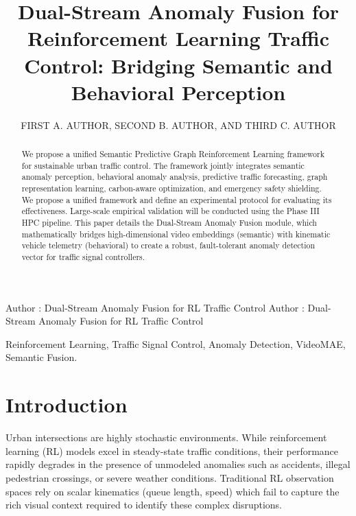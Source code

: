 \documentclass{ieeeaccess}
\begin{document}

\title{Dual-Stream Anomaly Fusion for Reinforcement Learning Traffic Control: Bridging Semantic and Behavioral Perception}
\author{\uppercase{First A. Author},
\uppercase{Second B. Author, and Third C. Author}}
\address[1]{Department of Computer Science, University of Technology, City, Country}

\markboth
{Author \headeretal: Dual-Stream Anomaly Fusion for RL Traffic Control}
{Author \headeretal: Dual-Stream Anomaly Fusion for RL Traffic Control}


\begin{abstract}
We propose a unified Semantic Predictive Graph Reinforcement Learning framework for sustainable urban traffic control. The framework jointly integrates semantic anomaly perception, behavioral anomaly analysis, predictive traffic forecasting, graph representation learning, carbon-aware optimization, and emergency safety shielding. We propose a unified framework and define an experimental protocol for evaluating its effectiveness. Large-scale empirical validation will be conducted using the Phase III HPC pipeline. This paper details the Dual-Stream Anomaly Fusion module, which mathematically bridges high-dimensional video embeddings (semantic) with kinematic vehicle telemetry (behavioral) to create a robust, fault-tolerant anomaly detection vector for traffic signal controllers.
\end{abstract}

\begin{keywords}
Reinforcement Learning, Traffic Signal Control, Anomaly Detection, VideoMAE, Semantic Fusion.
\end{keywords}

\titlepgskip=-15pt
\maketitle

\section{Introduction}
\label{sec:introduction}
Urban intersections are highly stochastic environments. While reinforcement learning (RL) models excel in steady-state traffic conditions, their performance rapidly degrades in the presence of unmodeled anomalies such as accidents, illegal pedestrian crossings, or severe weather conditions. Traditional RL observation spaces rely on scalar kinematics (queue length, speed) which fail to capture the rich visual context required to identify these complex disruptions.
\end{document}
